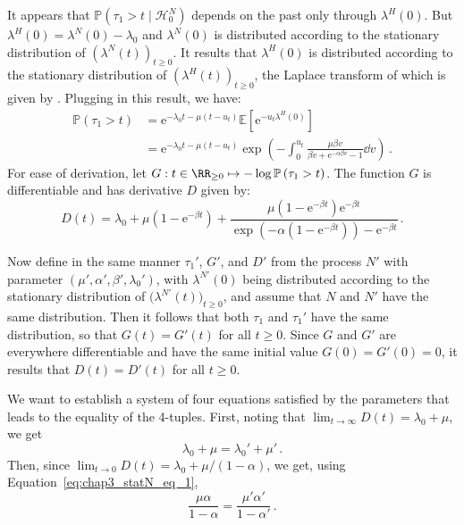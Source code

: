 \begin{subappendices}
It appears that $\mathbb P \left(\tau_1 > t \mid \mathcal H_0^N \right)$ depends on the past only through $\lambda^H(0)$.
But $\lambda^H(0) = \lambda^N(0) - \lambda_0$ and $\lambda^N(0)$ is distributed according to the stationary distribution of $\left( \lambda^N(t) \right)_{t \ge 0}$.
It results that $\lambda^H(0)$ is distributed according to the stationary distribution of $\left( \lambda^H(t) \right)_{t \ge 0}$, the Laplace transform of which is given by \textcite[Corollary 3.1]{Dassios2011}.
Plugging in this result, we have:
\begin{align*}
  \mathbb P \left(\tau_1 > t \right)
  &= \mathrm e^{-\lambda_0 t - \mu \left( t - u_t \right)} \mathbb E \left[ \mathrm e^{- u_t \lambda^H(0)} \right]\\
  &= \mathrm e^{-\lambda_0 t - \mu \left( t - u_t \right)} \exp \left( - \int_0^{u_t} \frac{\mu\beta v}{\beta v + \mathrm e^{-\alpha\beta v} - 1} \dd v \right) \,.
\end{align*}	
For ease of derivation, let $G : t \in \RR_{\ge 0} \mapsto - \log \mathbb P \left(\tau_1 > t \right)$.
The function $G$ is differentiable and has derivative $D$ given by:
\[
D(t) = \lambda_0 + \mu \left( 1 - \mathrm e^{-\beta t} \right) + \frac{\mu \left( 1 - \mathrm e^{-\beta t} \right) \mathrm e^{-\beta t}}{\exp \left(-\alpha \left( 1 - \mathrm e^{-\beta t} \right) \right) - \mathrm e^{-\beta t}} \,.
\]

Now define in the same manner $\tau_1'$, $G'$, and $D'$ from the process $N'$ with parameter $(\mu', \alpha', \beta', \lambda_0')$, with $\lambda^{N'}(0)$ being distributed according to the stationary distribution of $\bigl( \lambda^{N'}(t) \bigr)_{t \ge 0}$,
and assume that $N$ and $N'$ have the same distribution.
Then it follows that both $\tau_1$ and $\tau_1'$ have the same distribution, so that $G(t) = G'(t)$ for all $t \ge 0$.
Since $G$ and $G'$ are everywhere differentiable and have the same initial value $G(0) = G'(0) = 0$, it results that $D(t) = D'(t)$ for all $t \ge 0$.

We want to establish a system of four equations satisfied by the parameters that leads to the equality of the 4-tuples.
First, noting that $\lim_{t \to \infty} D(t) = \lambda_0 + \mu$, we get 
\begin{equation}\label{eq:chap3_statN_eq_1}
\lambda_0 + \mu = \lambda_0' + \mu' \,.
\end{equation}
Then, since $\lim_{t \to 0} D(t) = \lambda_0 + \mu / (1 - \alpha)$, we get, using Equation~\eqref{eq:chap3_statN_eq_1},
\begin{equation}\label{eq:chap3_statN_eq_2}
\frac{\mu\alpha}{1 - \alpha} = \frac{\mu'\alpha'}{1 - \alpha'} \,.
\end{equation}


\end{subappendices}
